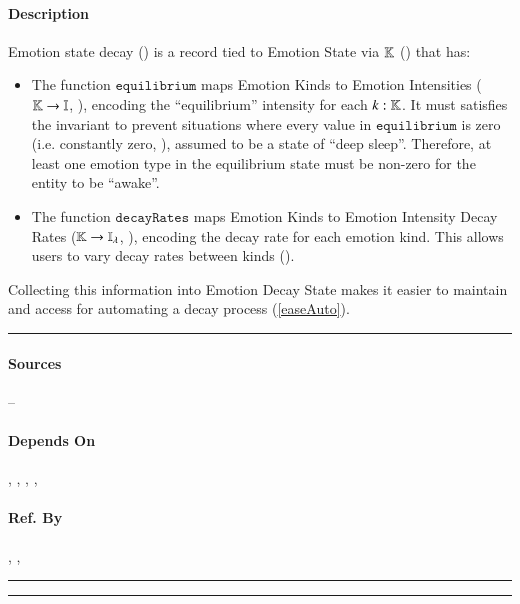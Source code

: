 \paragraph{Description} Emotion state decay () is a
record tied to Emotion State via $\mathbb{K}$ ()
that has:
\begin{itemize}

    \item The function $\mathtt{equilibrium}$ maps Emotion Kinds to Emotion
    Intensities ($\mathbb{K} \rightarrow \mathbb{I}$,
    ), encoding the ``equilibrium'' intensity for
    each $k : \mathbb{K}$. It must satisfies the invariant to prevent
    situations where every value in $\mathtt{equilibrium}$ is zero (i.e.
    constantly zero, ), assumed to be a state of
    ``deep sleep''. Therefore, at least one emotion type in the equilibrium
    state must be non-zero for the entity to be ``awake''.

    \item The function $\mathtt{decayRates}$ maps Emotion Kinds to Emotion
    Intensity Decay Rates ($\mathbb{K} \rightarrow \mathbb{I_{\lambda}}$,
    ), encoding the decay rate for each emotion kind.
    This allows users to vary decay rates between kinds
    ().

\end{itemize}

Collecting this information into Emotion Decay State makes it easier to
maintain and access for automating a decay process (\ref{easeAuto}). \\\hrule

\paragraph{Sources} --

\paragraph{Depends On} , ,
, , 

\paragraph{Ref. By} ,
, 
\\\hrule\vspace{0.5mm}\hrule

